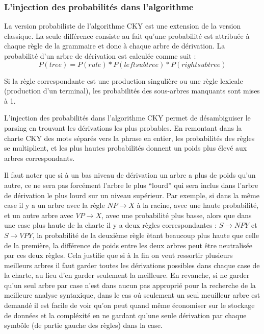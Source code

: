 \documentclass[12pt]{article}
\begin{document}
\subsubsection{L'injection des probabilit\'es dans l'algorithme}

La version probabiliste de l'algorithme CKY est une extension de la version
classique. La seule diff\'erence consiste au fait qu'une probabilit\'e est
attribu\'ee \`a chaque r\`egle de la grammaire et donc \`a chaque arbre de d\'erivation. La
probabilit\'e d'un arbre de d\'erivation est calcul\'ee comme suit :
$$P(tree) = P(rule) * P(left subtree) * P(right subtree)$$

Si la r\`egle correspondante est une production singuli\`ere ou une r\`egle lexicale
(production d'un terminal), les probabilit\'es des sous-arbres manquants sont mises
\`a 1. \par

L'injection des probabilit\'es dans l'algorithme CKY permet de d\'esambiguiser le
parsing en trouvant les d\'erivations les plus probables. En remontant dans la
charte CKY des mots s\'epar\'es vers la phrase en entier, les probabilit\'es des
r\`egles se multiplient, et les plus hautes probabilit\'es donnent un poids plus \'elev\'e aux arbres correspondants. \par

Il faut noter que si \`a un bas niveau de
d\'erivation un arbre a plus de poids qu'un autre, ce ne sera pas forc\'ement
l'arbre le plus ``lourd''  qui sera inclus dans l'arbre de d\'erivation le plus
lourd sur un niveau sup\'erieur. Par exemple, si dans la m\^eme case il y a un arbre
avec la r\`egle $NP \rightarrow X$ \`a la racine, avec une haute probabilit\'e, et un
autre arbre avec $VP \rightarrow X$, avec une probabilit\'e plus basse, alors que
dans une case plus haute de la charte il y a deux r\`egles correspondantes : $S
\rightarrow NP Y$ et $S \rightarrow VP Y$, la probabilit\'e de la deuxi\`eme r\`egle
\`etant beaucoup plus haute que celle de la premi\`ere, la diff\'erence de poids entre
les deux arbres peut \^etre neutralis\'ee par ces deux r\`egles. Cela justifie
que si \`a la fin on veut ressortir plusieurs meilleurs arbres il
faut garder toutes les d\'erivations possibles dans chaque case de la charte, au
lieu d'en garder seulement la meilleure. En revanche, si ne garder qu'un seul arbre par case n'est
 dans aucun pas appropri\'e pour la recherche de la meilleure analyse syntaxique,
 dans le cas o\'u seulement un seul meuilleur arbre est demand\'e
 il est facile de voir qu'on peut quand m\^eme \'economiser sur le stockage de
 donn\'ees et la compl\'exit\'e en ne gardant qu'une seule d\'erivation par
 chaque symb\^ole (de partie gauche des r\`egles) dans la case. \par
\end{document}
